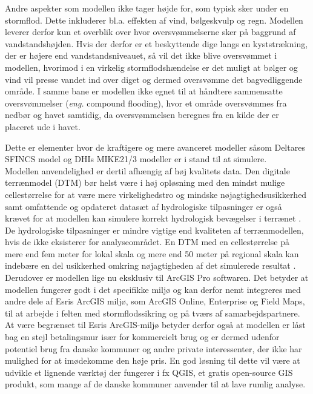 Andre aspekter som modellen ikke tager højde for, som typisk sker under en stormflod. Dette inkluderer bl.a. effekten af vind, bølgeskvulp og regn. Modellen leverer derfor kun et overblik over hvor oversvømmelserne sker på baggrund af vandstandshøjden. Hvis der derfor er et beskyttende dige langs en kyststrækning, der er højere end vandstandsniveauet, så vil det ikke blive oversvømmet i modellen, hvorimod i en virkelig stormflodshændelse er det muligt at bølger og vind vil presse vandet ind over diget og dermed oversvømme det bagvedliggende område. I samme bane er modellen ikke egnet til at håndtere sammensatte oversvømmelser (\textit{eng.} compound flooding), hvor et område oversvømmes fra nedbør og havet samtidig, da oversvømmelsen beregnes fra en kilde der er placeret ude i havet. 

Dette er elementer hvor de kraftigere og mere avanceret modeller såsom Deltares SFINCS model og DHIs MIKE21/3 modeller er i stand til at simulere.\\

Modellen anvendelighed er dertil afhængig af høj kvalitets data. Den digitale terrænmodel (DTM) bør helst være i høj opløsning med den mindst mulige cellestørrelse \citep{seenath_effects_2018, williams_geographic_2022} for at være mere virkelighedstro og mindske nøjagtighedsusikkerhed samt omfattende og opdateret datasæt af hydrologiske tilpasninger er også krævet for at modellen kan simulere korrekt hydrologisk bevægelser i terrænet \citep{bales_sources_2009}. De hydrologiske tilpasninger er mindre vigtige end kvaliteten af terrænmodellen, hvis de ikke eksisterer for analyseområdet. En DTM med en cellestørrelse på mere end fem meter for lokal skala og mere end 50 meter på regional skala kan indebære en del usikkerhed omkring nøjagtigheden af det simulerede resultat \citep{williams_geographic_2022}.\\

Derudover er modellen lige nu eksklusiv til ArcGIS Pro softwaren. Det betyder at modellen fungerer godt i det specifikke miljø og kan derfor nemt integreres med andre dele af Esris ArcGIS miljø, som ArcGIS Online, Enterprise og Field Maps, til at arbejde i felten med stormflodssikring og på tværs af samarbejdspartnere. At være begrænset til Esris ArcGIS-miljø betyder derfor også at modellen er låst bag en stejl betalingsmur især for kommercielt brug og er dermed udenfor potentiel brug fra danske kommuner og andre private interessenter, der ikke har mulighed for at imødekomme den høje pris. En god løsning til dette vil være at udvikle et lignende værktøj der fungerer i fx QGIS, et gratis open-source GIS produkt, som mange af de danske kommuner anvender til at lave rumlig analyse.\\



